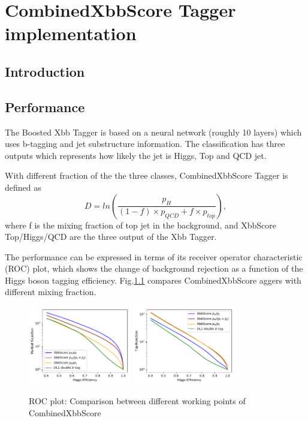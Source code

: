 \chapter{CombinedXbbScore Tagger implementation}
\section{Introduction}

\section{Performance}

\par The Boosted Xbb Tagger is based on a neural network (roughly 10 layers)  which uses b-tagging and jet substructure information. The classification has three outputs which represents how likely the jet is Higgs, Top and QCD jet.  
\par With different fraction of the the three classes, CombinedXbbScore Tagger is defined as
\begin{equation}
D=ln(\frac{p_H}{(1-f)\times p_{QCD}+f\times p_{top}}),
\end{equation}
where f is the mixing fraction of top jet in the background, and XbbScore Top/Higgs/QCD are the three output of the Xbb Tagger.

\par The performance can be expressed in terms of its receiver operator characteristic (ROC) plot, which shows the change of background rejection as a function of the Higgs boson tagging efficiency. 
Fig.\ref{fig:roctop} compares CombinedXbbScore aggers with different mixing fraction.
\begin{figure}[h]
   \centering
\includegraphics[width=0.4\textwidth]{appendices/fig/roc_multijet.pdf}
\includegraphics[width=0.4\textwidth]{appendices/fig/roc_top.pdf}
\caption{ ROC plot: Comparison between different working points of CombinedXbbScore}

\label{fig:roctop}
\end{figure}

